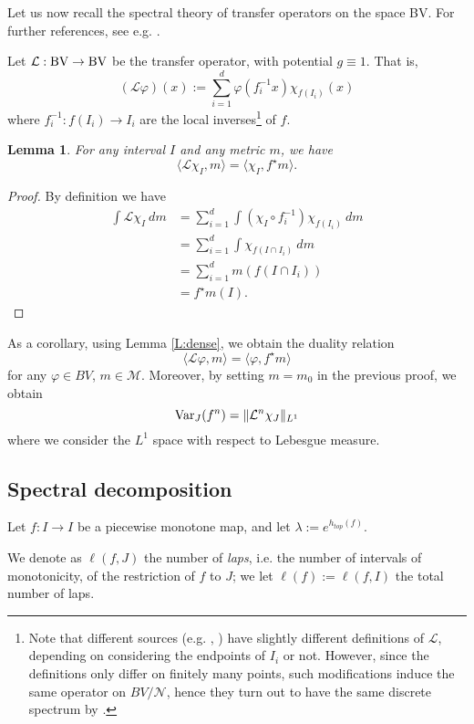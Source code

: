 \documentclass[11pt]{amsart}
\newtheorem{lemma}[theorem]{Lemma}
\begin{document}
Let us now recall the spectral theory of transfer operators on the space BV. For further references, see e.g. \cite{Baladi-book}.

Let $\mathcal{L} : \textup{BV} \to \textup{BV}$ be the transfer operator, with potential $g \equiv 1$. That is,
$$(\mathcal{L} \varphi)(x) := \sum_{i = 1}^d \varphi (f_i^{-1} x) \chi_{f(I_i)}(x) $$
where $f_i^{-1} : f(I_i) \to I_i$ are the local inverses\footnote{Note that different sources (e.g. \cite{Baladi-Keller}, \cite{Rugh}) have slightly different definitions of $\mathcal{L}$, depending on considering the endpoints 
of $I_i$ or not. However, since the definitions only differ on finitely many points, such modifications induce the same operator on $BV/\mathcal{N}$, hence they turn out to have the same discrete spectrum by \cite[Proposition 3.4]{Baladi-book}.} of $f$. 

\begin{lemma}
For any interval $I$ and any metric $m$, we have 
$$\langle \mathcal{L} \chi_I, m \rangle = \langle \chi_I, f^\star m \rangle.$$
\end{lemma}

\begin{proof}
By definition we have 
\begin{align*}
\int \mathcal{L} \chi_I \ dm & = \sum_{i = 1}^d \int (\chi_I \circ f_i^{-1}) \chi_{f(I_i)} \ dm\\
& = \sum_{i = 1}^d \int \chi_{f(I \cap I_i)} \ dm \\
& = \sum_{i = 1}^d m(f(I \cap I_i)) \\
& = f^\star m(I).
\end{align*}
\end{proof}

As a corollary, using Lemma \ref{L:dense}, 
we obtain the duality relation 
$$\langle \mathcal{L} \varphi, m \rangle = \langle \varphi, f^\star m \rangle$$
for any $\varphi \in BV$, $m \in \mathcal{M}$. 
Moreover, by setting $m = m_0$ in the previous proof, we obtain
$$\textup{Var}_J (f^n) = \Vert \mathcal{L}^n \chi_J \Vert_{L^1}$$
where we consider the $L^1$ space with respect to Lebesgue measure. 

\subsection{Spectral decomposition}

Let $f : I \to I$ be a piecewise monotone map, and let $\lambda := e^{h_{top}(f)}$. 

We denote as $\ell(f, J)$ the number of \emph{laps}, i.e. the number of intervals of monotonicity, of the restriction of $f$ to $J$; 
we let $\ell(f) := \ell(f, I)$ the total number of laps. 
\end{document}
